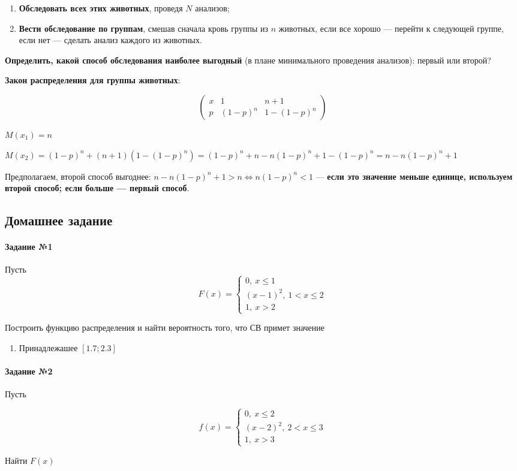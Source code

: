 \documentclass{article}
\begin{document}
\begin{enumerate}
    \item \textbf{Обследовать всех этих животных}, проведя $N$ анализов;
    \item \textbf{Вести обследование по группам}, смешав сначала кровь группы из $n$ животных, если все хорошо — перейти к следующей группе, если нет — сделать анализ каждого из животных.
\end{enumerate}

\textbf{Определить, какой способ обследования наиболее выгодный} (в плане минимального проведения анализов): первый или второй?

\textbf{Закон распределения для группы животных}:

$$
\begin{pmatrix}
    x & 1 & n + 1 \\
    p & (1-p)^{n} & 1 - (1-p)^{n} 
\end{pmatrix}
$$

$M(x_1) = n$

$M(x_2) = (1-p)^{n} + (n + 1)(1 - (1-p)^{n}) = (1-p)^{n} + n - n(1-p)^{n} + 1 - (1-p)^{n} = n - n(1-p)^{n} + 1$

Предполагаем, второй способ выгоднее: $n - n(1-p)^{n} + 1 > n \Longleftrightarrow n(1-p)^{n} < 1$ — \textbf{если это значение меньше единице, используем второй способ; если больше — первый способ}.

\subsection{Домашнее задание}

\paragraph{Задание №1}

Пусть $$F(x) = \begin{cases}
    0, \ x \le 1 \\
    (x - 1)^2, \ 1 < x \le 2 \\
    1, \ x > 2
\end{cases}
$$

Построить функцию распределения и найти вероятность того, что СВ примет значение

\begin{multicols}{2}
    \begin{enumerate}
        \item Принадлежашее $[1.7; 2.3]$
    \end{enumerate}    
\end{multicols}

\paragraph{Задание №2}

Пусть

$$f(x) = \begin{cases}
    0, \ x \le 2 \\
    (x-2)^2, \ 2 < x \le 3 \\
    1, \ x > 3
\end{cases}$$

Найти $F(x)$
\end{document}
